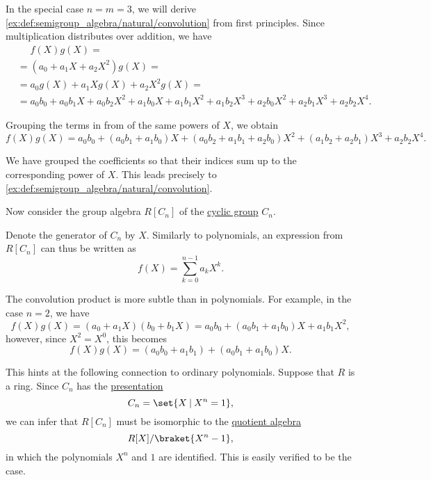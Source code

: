 \begin{example}
\begin{thmenum}
    In the special case \( n = m = 3 \), we will derive \eqref{ex:def:semigroup_algebra/natural/convolution} from first principles. Since multiplication distributes over addition, we have
    \small
    \begin{align*}
      &\phantom{{}={}}
      f(X) g(X)
      = \\ &=
      (a_0 + a_1 X + a_2 X^2) g(X)
      = \\ &=
      a_0 g(X) + a_1 X g(X) + a_2 X^2 g(X)
      = \\ &=
      a_0 b_0 + a_0 b_1 X + a_0 b_2 X^2 + a_1 b_0 X + a_1 b_1 X^2 + a_1 b_2 X^3 + a_2 b_0 X^2 + a_2 b_1 X^3 + a_2 b_2 X^4.
    \end{align*}
    \normalsize

    Grouping the terms in from of the same powers of \( X \), we obtain
    \small
    \begin{equation*}
      f(X) g(X) = a_0 b_0 + (a_0 b_1 + a_1 b_0) X + (a_0 b_2 + a_1 b_1 + a_2 b_0) X^2 + (a_1 b_2 + a_2 b_1) X^3 + a_2 b_2 X^4.
    \end{equation*}
    \normalsize

    We have grouped the coefficients so that their indices sum up to the corresponding power of \( X \). This leads precisely to \eqref{ex:def:semigroup_algebra/natural/convolution}.

     Now consider the group algebra \( R[C_n] \) of the \hyperref[def:cyclic_group]{cyclic group} \( C_n \).

    Denote the generator of \( C_n \) by \( X \). Similarly to polynomials, an expression from \( R[C_n] \) can thus be written as
    \begin{equation*}
      f(X) = \sum_{k=0}^{n-1} a_k X^k.
    \end{equation*}

    The convolution product is more subtle than in polynomials. For example, in the case \( n = 2 \), we have
    \begin{equation*}
      f(X) g(X) = (a_0 + a_1 X) (b_0 + b_1 X) = a_0 b_0 + (a_0 b_1 + a_1 b_0) X + a_1 b_1 X^2,
    \end{equation*}
    however, since \( X^2 = X^0 \), this becomes
    \begin{equation*}
      f(X) g(X) = (a_0 b_0 + a_1 b_1) + (a_0 b_1 + a_1 b_0) X.
    \end{equation*}

    This hints at the following connection to ordinary polynomials. Suppose that \( R \) is a ring. Since \( C_n \) has the \hyperref[def:group_presentation]{presentation}
    \begin{equation*}
      C_n = \set{ X \given X^n = 1 },
    \end{equation*}
    we can infer that \( R[C_n] \) must be isomorphic to the \hyperref[def:algebra_over_ring/quotient]{quotient algebra}
    \begin{equation*}
      R[X] / \braket{ X^n - 1 },
    \end{equation*}
    in which the polynomials \( X^n \) and \( 1 \) are identified. This is easily verified to be the case.


\end{thmenum}
\end{example}
